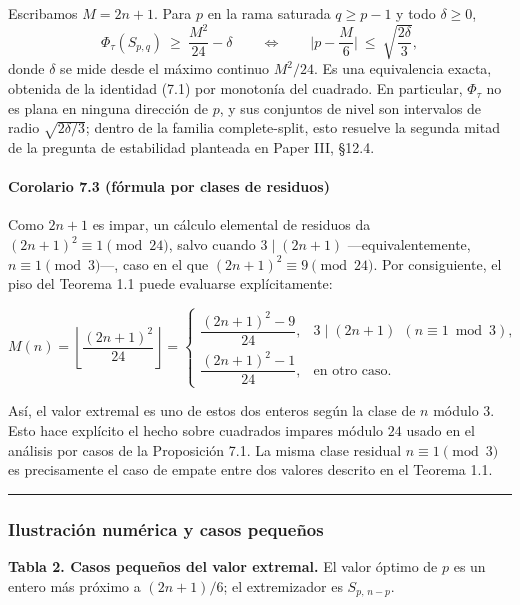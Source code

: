 \documentclass[spanish,11pt,a4paper]{article}
\begin{document}
Escribamos \(M=2n+1\). Para \(p\) en la rama saturada \(q\ge p-1\) y
todo \(\delta\ge0\), \[
\Phi_\tau(S_{p,q})\ \ge\ \frac{M^2}{24}-\delta\qquad\Longleftrightarrow\qquad \Big|p-\frac{M}{6}\Big|\ \le\ \sqrt{\frac{2\delta}{3}},
\] donde \(\delta\) se mide desde el máximo continuo \(M^2/24\). Es una
equivalencia exacta, obtenida de la identidad (7.1) por monotonía del
cuadrado. En particular, \(\Phi_\tau\) no es plana en ninguna dirección
de \(p\), y sus conjuntos de nivel son intervalos de radio
\(\sqrt{2\delta/3}\); dentro de la familia complete-split, esto resuelve
la segunda mitad de la pregunta de estabilidad planteada en Paper III,
§12.4.

\paragraph{Corolario 7.3 (fórmula por clases de
residuos)}\label{corolario-7.3-fuxf3rmula-por-clases-de-residuos}

Como \(2n+1\) es impar, un cálculo elemental de residuos da
\((2n+1)^2\equiv1\pmod{24}\), salvo cuando \(3\mid(2n+1)\)
---equivalentemente, \(n\equiv1\pmod3\)---, caso en el que
\((2n+1)^2\equiv9\pmod{24}\). Por consiguiente, el piso del Teorema 1.1
puede evaluarse explícitamente:

\[
M(n)=\left\lfloor\frac{(2n+1)^2}{24}\right\rfloor
=
\begin{cases}
\dfrac{(2n+1)^2-9}{24}, & 3\mid(2n+1)\ \ (n\equiv1\bmod3),\\[3mm]
\dfrac{(2n+1)^2-1}{24}, & \text{en otro caso.}
\end{cases}
\]

Así, el valor extremal es uno de estos dos enteros según la clase de
\(n\) módulo \(3\). Esto hace explícito el hecho sobre cuadrados impares
módulo \(24\) usado en el análisis por casos de la Proposición 7.1. La
misma clase residual \(n\equiv1\pmod3\) es precisamente el caso de
empate entre dos valores descrito en el Teorema 1.1.

\begin{center}\rule{0.5\linewidth}{0.5pt}\end{center}

\subsubsection{Ilustración numérica y casos
pequeños}\label{ilustraciuxf3n-numuxe9rica-y-casos-pequeuxf1os}

\textbf{Tabla 2. Casos pequeños del valor extremal.} El valor óptimo de
\(p\) es un entero más próximo a \((2n+1)/6\); el extremizador es
\(S_{p,\,n-p}\).
\end{document}

